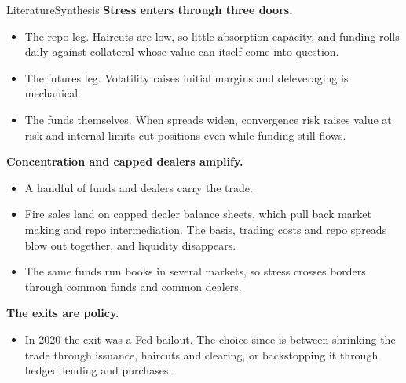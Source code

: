 \documentclass[aspectratio=169,11pt]{beamer}
\begin{document}
\begin{frame}{Literature}{Synthesis}
  \footnotesize
  \textbf{Stress enters through three doors.}
  \begin{itemize}
    \item The repo leg. Haircuts are low, so little absorption capacity, and funding rolls daily against collateral whose value can itself come into question.
    \item The futures leg. Volatility raises initial margins and deleveraging is mechanical.
    \item The funds themselves. When spreads widen, convergence risk raises value at risk and internal limits cut positions even while funding still flows.
  \end{itemize}
  \smallskip
  \textbf{Concentration and capped dealers amplify.}
  \begin{itemize}
    \item A handful of funds and dealers carry the trade. 
    \item Fire sales land on capped dealer balance sheets, which pull back market making and repo intermediation. The basis, trading costs and repo spreads blow out together, and liquidity disappears.
    \item The same funds run books in several markets, so stress crosses borders through common funds and common dealers.
  \end{itemize}
  \smallskip
  \textbf{The exits are policy.}
  \begin{itemize}
    \item In 2020 the exit was a Fed bailout. The choice since is between shrinking the trade through issuance, haircuts and clearing, or backstopping it through hedged lending and purchases.
  \end{itemize}
\end{frame}

\end{document}
